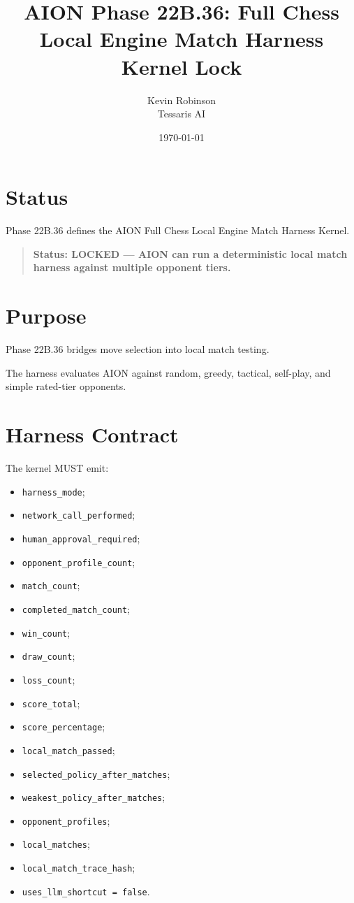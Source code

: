\documentclass[11pt,a4paper]{article}
\title{\textbf{AION Phase 22B.36: Full Chess Local Engine Match Harness Kernel Lock}}
\author{Kevin Robinson\\Tessaris AI}
\date{\today}
\begin{document}
\maketitle

\section{Status}

Phase 22B.36 defines the AION Full Chess Local Engine Match Harness Kernel.

\begin{quote}
\textbf{Status: LOCKED --- AION can run a deterministic local match harness against multiple opponent tiers.}
\end{quote}

\section{Purpose}

Phase 22B.36 bridges move selection into local match testing.

The harness evaluates AION against random, greedy, tactical, self-play, and simple rated-tier opponents.

\section{Harness Contract}

The kernel MUST emit:

\begin{itemize}
  \item \texttt{harness\_mode};
  \item \texttt{network\_call\_performed};
  \item \texttt{human\_approval\_required};
  \item \texttt{opponent\_profile\_count};
  \item \texttt{match\_count};
  \item \texttt{completed\_match\_count};
  \item \texttt{win\_count};
  \item \texttt{draw\_count};
  \item \texttt{loss\_count};
  \item \texttt{score\_total};
  \item \texttt{score\_percentage};
  \item \texttt{local\_match\_passed};
  \item \texttt{selected\_policy\_after\_matches};
  \item \texttt{weakest\_policy\_after\_matches};
  \item \texttt{opponent\_profiles};
  \item \texttt{local\_matches};
  \item \texttt{local\_match\_trace\_hash};
  \item \texttt{uses\_llm\_shortcut = false}.
\end{itemize}
\end{document}
